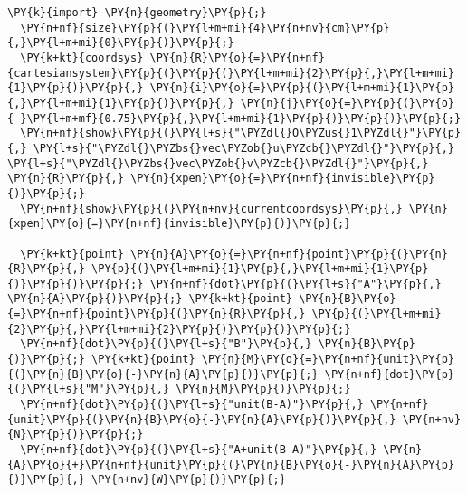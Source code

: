 \begin{Verbatim}[commandchars=\\\{\}]
  \PY{k}{import} \PY{n}{geometry}\PY{p}{;}
  \PY{n+nf}{size}\PY{p}{(}\PY{l+m+mi}{4}\PY{n+nv}{cm}\PY{p}{,}\PY{l+m+mi}{0}\PY{p}{)}\PY{p}{;}
  \PY{k+kt}{coordsys} \PY{n}{R}\PY{o}{=}\PY{n+nf}{cartesiansystem}\PY{p}{(}\PY{p}{(}\PY{l+m+mi}{2}\PY{p}{,}\PY{l+m+mi}{1}\PY{p}{)}\PY{p}{,} \PY{n}{i}\PY{o}{=}\PY{p}{(}\PY{l+m+mi}{1}\PY{p}{,}\PY{l+m+mi}{1}\PY{p}{)}\PY{p}{,} \PY{n}{j}\PY{o}{=}\PY{p}{(}\PY{o}{-}\PY{l+m+mf}{0.75}\PY{p}{,}\PY{l+m+mi}{1}\PY{p}{)}\PY{p}{)}\PY{p}{;}
  \PY{n+nf}{show}\PY{p}{(}\PY{l+s}{"\PYZdl{}O\PYZus{}1\PYZdl{}"}\PY{p}{,} \PY{l+s}{"\PYZdl{}\PYZbs{}vec\PYZob{}u\PYZcb{}\PYZdl{}"}\PY{p}{,} \PY{l+s}{"\PYZdl{}\PYZbs{}vec\PYZob{}v\PYZcb{}\PYZdl{}"}\PY{p}{,} \PY{n}{R}\PY{p}{,} \PY{n}{xpen}\PY{o}{=}\PY{n+nf}{invisible}\PY{p}{)}\PY{p}{;}
  \PY{n+nf}{show}\PY{p}{(}\PY{n+nv}{currentcoordsys}\PY{p}{,} \PY{n}{xpen}\PY{o}{=}\PY{n+nf}{invisible}\PY{p}{)}\PY{p}{;}

  \PY{k+kt}{point} \PY{n}{A}\PY{o}{=}\PY{n+nf}{point}\PY{p}{(}\PY{n}{R}\PY{p}{,} \PY{p}{(}\PY{l+m+mi}{1}\PY{p}{,}\PY{l+m+mi}{1}\PY{p}{)}\PY{p}{)}\PY{p}{;} \PY{n+nf}{dot}\PY{p}{(}\PY{l+s}{"A"}\PY{p}{,} \PY{n}{A}\PY{p}{)}\PY{p}{;} \PY{k+kt}{point} \PY{n}{B}\PY{o}{=}\PY{n+nf}{point}\PY{p}{(}\PY{n}{R}\PY{p}{,} \PY{p}{(}\PY{l+m+mi}{2}\PY{p}{,}\PY{l+m+mi}{2}\PY{p}{)}\PY{p}{)}\PY{p}{;}
  \PY{n+nf}{dot}\PY{p}{(}\PY{l+s}{"B"}\PY{p}{,} \PY{n}{B}\PY{p}{)}\PY{p}{;} \PY{k+kt}{point} \PY{n}{M}\PY{o}{=}\PY{n+nf}{unit}\PY{p}{(}\PY{n}{B}\PY{o}{-}\PY{n}{A}\PY{p}{)}\PY{p}{;} \PY{n+nf}{dot}\PY{p}{(}\PY{l+s}{"M"}\PY{p}{,} \PY{n}{M}\PY{p}{)}\PY{p}{;}
  \PY{n+nf}{dot}\PY{p}{(}\PY{l+s}{"unit(B-A)"}\PY{p}{,} \PY{n+nf}{unit}\PY{p}{(}\PY{n}{B}\PY{o}{-}\PY{n}{A}\PY{p}{)}\PY{p}{,} \PY{n+nv}{N}\PY{p}{)}\PY{p}{;}
  \PY{n+nf}{dot}\PY{p}{(}\PY{l+s}{"A+unit(B-A)"}\PY{p}{,} \PY{n}{A}\PY{o}{+}\PY{n+nf}{unit}\PY{p}{(}\PY{n}{B}\PY{o}{-}\PY{n}{A}\PY{p}{)}\PY{p}{,} \PY{n+nv}{W}\PY{p}{)}\PY{p}{;}
\end{Verbatim}
